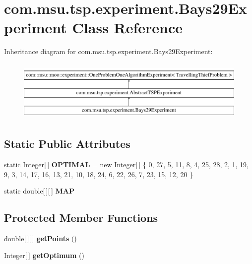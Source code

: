 \hypertarget{classcom_1_1msu_1_1tsp_1_1experiment_1_1Bays29Experiment}{\section{com.\-msu.\-tsp.\-experiment.\-Bays29\-Experiment Class Reference}
\label{classcom_1_1msu_1_1tsp_1_1experiment_1_1Bays29Experiment}
}
Inheritance diagram for com.\-msu.\-tsp.\-experiment.\-Bays29\-Experiment\-:\begin{figure}[H]
\begin{center}
\leavevmode
\includegraphics[height=3.000000cm]{classcom_1_1msu_1_1tsp_1_1experiment_1_1Bays29Experiment}
\end{center}
\end{figure}
\subsection*{Static Public Attributes}
\begin{DoxyCompactItemize}
\item 
\hypertarget{classcom_1_1msu_1_1tsp_1_1experiment_1_1Bays29Experiment_af4c33d5963feccff64f5e0c6b226ecc8}{static Integer\mbox{[}$\,$\mbox{]} {\bfseries O\-P\-T\-I\-M\-A\-L} = new Integer\mbox{[}$\,$\mbox{]} \{ 0, 27, 5, 11, 8, 4, 25, 28, 2, 1, 19, 9, 3, 14, 17, 16, 13, 21, 10, 18, 24, 6, 22, 26, 7, 23, 15, 12, 20 \}}\label{classcom_1_1msu_1_1tsp_1_1experiment_1_1Bays29Experiment_af4c33d5963feccff64f5e0c6b226ecc8}

\item 
static double\mbox{[}$\,$\mbox{]}\mbox{[}$\,$\mbox{]} {\bfseries M\-A\-P}
\end{DoxyCompactItemize}
\subsection*{Protected Member Functions}
\begin{DoxyCompactItemize}
\item 
\hypertarget{classcom_1_1msu_1_1tsp_1_1experiment_1_1Bays29Experiment_af0bd8b40e641901b5b1a916ac3fd0a2d}{double\mbox{[}$\,$\mbox{]}\mbox{[}$\,$\mbox{]} {\bfseries get\-Points} ()}\label{classcom_1_1msu_1_1tsp_1_1experiment_1_1Bays29Experiment_af0bd8b40e641901b5b1a916ac3fd0a2d}

\item 
\hypertarget{classcom_1_1msu_1_1tsp_1_1experiment_1_1Bays29Experiment_a0c84bb2d195c704bc837fed2b9acdbf2}{Integer\mbox{[}$\,$\mbox{]} {\bfseries get\-Optimum} ()}\label{classcom_1_1msu_1_1tsp_1_1experiment_1_1Bays29Experiment_a0c84bb2d195c704bc837fed2b9acdbf2}

\end{DoxyCompactItemize}
